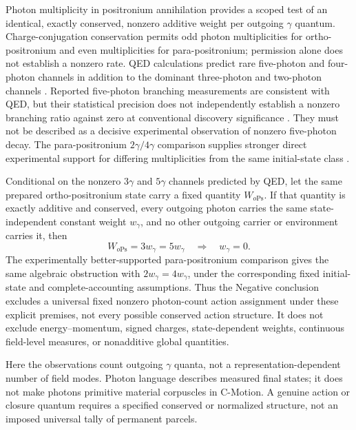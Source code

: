 \documentclass[11pt]{article}
\theoremstyle{definition}
\newcommand{\cmotion}{\mbox{C-Motion}}
\begin{document}
Photon multiplicity in positronium annihilation provides a scoped test of an
identical, exactly conserved, nonzero additive weight per outgoing $\gamma$
quantum.  Charge-conjugation conservation permits odd photon multiplicities for
ortho-positronium and even multiplicities for para-positronium; permission alone
does not establish a nonzero rate.  QED calculations predict rare five-photon
and four-photon channels in addition to the dominant three-photon and two-photon
channels \cite{AdkinsBrown1983FivePhoton,Lepage1983Multiphoton}.
Reported five-photon branching measurements are consistent with QED, but their
statistical precision does not independently establish a nonzero branching ratio
against zero at conventional discovery significance
\cite{Matsumoto1996FivePhoton,Vetter2002FivePhoton}.
They must not be described as a decisive experimental observation of nonzero
five-photon decay.  The para-positronium $2\gamma/4\gamma$ comparison supplies
stronger direct experimental support for differing multiplicities from the same
initial-state class \cite{Vetter2002FivePhoton}.

Conditional on the nonzero $3\gamma$ and $5\gamma$ channels predicted by QED,
let the same prepared ortho-positronium state carry a fixed quantity
$W_{o\mathrm{Ps}}$.  If that quantity is exactly additive and conserved, every
outgoing photon carries the same state-independent constant weight $w_\gamma$,
and no other outgoing carrier or environment carries it, then
\begin{equation}
\boxed{W_{o\mathrm{Ps}}=3w_\gamma=5w_\gamma
\quad\Longrightarrow\quad w_\gamma=0.}
\label{eq:fixed_photon_count_no_go}
\end{equation}
The experimentally better-supported para-positronium comparison gives the same
algebraic obstruction with $2w_\gamma=4w_\gamma$, under the corresponding fixed
initial-state and complete-accounting assumptions.  Thus the Negative conclusion
excludes a universal fixed nonzero photon-count action assignment under these
explicit premises, not every possible conserved action structure.  It does not
exclude energy--momentum, signed charges, state-dependent weights, continuous
field-level measures, or nonadditive global quantities.

Here the observations count outgoing $\gamma$ quanta, not a representation-dependent
number of field modes.  Photon language describes measured final states; it does
not make photons primitive material corpuscles in \cmotion{}.  A genuine action
or closure quantum requires a specified conserved or normalized structure, not
an imposed universal tally of permanent parcels.
\end{document}
